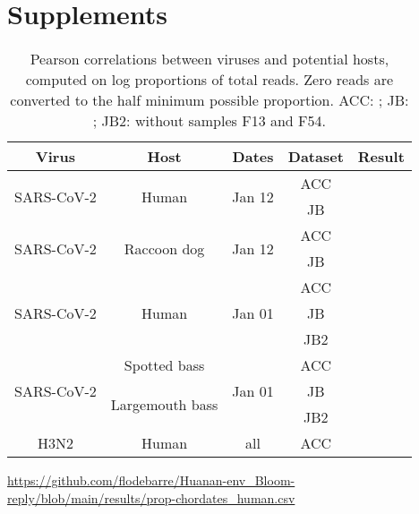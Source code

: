 \documentclass[11pt]{article}
\def \sct {\mbox{SARS-CoV-2}}
\begin{document}
\clearpage
\section*{Supplements}
\appendix 

\setcounter{table}{0}
\renewcommand{\thetable}{S\arabic{table}}

\setcounter{figure}{0}
\renewcommand{\thefigure}{S\arabic{figure}}

\begin{table}[h!]
{\small
\def \sepline {0.75em}
\begin{tabular}{c  c  c  c  l}
\bf Virus & \bf Host & \bf Dates & \bf Dataset & \bf Result \\ \hline
\multirow{2}{*}{\sct{}} & \multirow{2}{*}{Human} & \multirow{2}{*}{Jan 12} & ACC & \ACCTwelfthSCHS{} \\
&&& JB &  \JBTwelfthSCHS{} \\[\sepline]
\multirow{2}{*}{\sct{}} & \multirow{2}{*}{Raccoon dog} & \multirow{2}{*}{Jan 12} & ACC & \ACCTwelfthSCRD{} \\
&&& JB &  \JBTwelfthSCRD{} \\[\sepline]
\multirow{3}{*}{\sct{}} & \multirow{3}{*}{Human} & \multirow{3}{*}{Jan 01} & ACC & \ACCFirstSCHS{} \\
&&& JB &  \JBFirstSCHS{} \\
&&& JB2 &  \JBFirstSCHStwo{} \\[\sepline]
%
\multirow{3}{*}{\sct{}} & Spotted bass& \multirow{3}{*}{Jan 01} & ACC & \ACCFirstSCSB{} \\
& \multirow{2}{*}{Largemouth bass} && JB &  \JBFirstSCLB{} \\
& && JB2 &  \JBFirstSCLBtwo{} \\
[\sepline]
\multirow{1}{*}{H3N2} & \multirow{1}{*}{Human} & \multirow{1}{*}{all} & ACC & \ACCAllHNHS{} \\[\sepline] %
\end{tabular}
}
\caption{Pearson correlations between viruses and potential hosts, computed on log proportions of total reads. Zero reads are converted to the half minimum possible proportion. ACC: \citet{ACC2023bioRxiv}; JB: \citet{Bloom2023VE}; JB2:  \citet{Bloom2023VE} without samples F13 and F54. }
\label{tab:summarycor}
\end{table}

\begin{table}
\url{https://github.com/flodebarre/Huanan-env_Bloom-reply/blob/main/results/prop-chordates_human.csv}
\caption{Proportion of human reads among chordate reads, in samples with and without \sct{} reads; data from \citet{Bloom2023VE}. }
\label{tab:propHuman}
\end{table}
\end{document}
